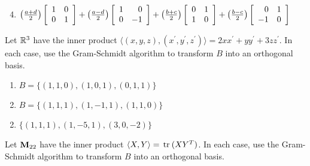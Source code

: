 \begin{multicols}{2}
\begin{ex}
\begin{sol}
\begin{enumerate}[label={\alph*.}]
\setcounter{enumi}{3}
\item  $\left(\tfrac{a + d}{2} \right)
\left[ \begin{array}{rr}
1 & 0 \\
0 & 1
\end{array} \right]
+ \left(\tfrac{a - d}{2}\right)
\left[ \begin{array}{rr}
1 & 0 \\
0 & -1
\end{array} \right]
+ \left(\tfrac{b + c}{2}\right)
\left[ \begin{array}{rr}
0 & 1 \\
1 & 0
\end{array} \right]
+ \left(\tfrac{b - c}{2}\right)
\left[ \begin{array}{rr}
0 & 1 \\
-1 & 0
\end{array} \right]$

\end{enumerate}
\end{sol}
\end{ex}

\begin{ex}
Let $\mathbb{R}^3$ have the inner product $\langle (x, y, z), (x^\prime, y^\prime, z^\prime) \rangle = 2xx^\prime + yy^\prime + 3zz^\prime$. In each case, use the Gram-Schmidt algorithm to transform $B$ into an orthogonal basis.

\begin{enumerate}[label={\alph*.}]
\item $ B = \{(1, 1, 0), (1, 0, 1), (0, 1, 1) \} $

\item $ B = \{(1, 1, 1), (1, -1, 1), (1, 1, 0) \} $

\end{enumerate}
\begin{sol}
\begin{enumerate}[label={\alph*.}]
\setcounter{enumi}{1}
\item  $\{(1, 1, 1), (1, -5, 1), (3, 0, -2)\}$

\end{enumerate}
\end{sol}
\end{ex}

\begin{ex}
Let $\textbf{M}_{22}$ have the inner product $\langle X, Y\rangle = \thinspace\operatorname{tr\medspace}(XY^{T})$. In each case, use the Gram-Schmidt algorithm to transform $B$ into an orthogonal basis.


\end{ex}
\end{multicols}
